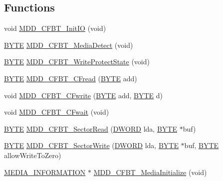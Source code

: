 \subsection*{Functions}
\begin{DoxyCompactItemize}
\item 
void \hyperlink{_c_f-_01_bit_01transaction_8h_ad8bb829eafee87e07a79cb75c3a40207}{M\+D\+D\+\_\+\+C\+F\+B\+T\+\_\+\+Init\+I\+O} (void)
\item 
\hyperlink{_generic_type_defs_8h_a4ae1dab0fb4b072a66584546209e7d58}{B\+Y\+T\+E} \hyperlink{_c_f-_01_bit_01transaction_8h_a3e3cb8714ab05c9eb06c1256cb66207e}{M\+D\+D\+\_\+\+C\+F\+B\+T\+\_\+\+Media\+Detect} (void)
\item 
\hyperlink{_generic_type_defs_8h_a4ae1dab0fb4b072a66584546209e7d58}{B\+Y\+T\+E} \hyperlink{_c_f-_01_bit_01transaction_8h_a5a37a6a14c1346909d87f15e269b95a7}{M\+D\+D\+\_\+\+C\+F\+B\+T\+\_\+\+Write\+Protect\+State} (void)
\item 
\hyperlink{_generic_type_defs_8h_a4ae1dab0fb4b072a66584546209e7d58}{B\+Y\+T\+E} \hyperlink{_c_f-_01_bit_01transaction_8h_aea3f7bb910466bb42e9fcf2aceda94f8}{M\+D\+D\+\_\+\+C\+F\+B\+T\+\_\+\+C\+Fread} (\hyperlink{_generic_type_defs_8h_a4ae1dab0fb4b072a66584546209e7d58}{B\+Y\+T\+E} add)
\item 
void \hyperlink{_c_f-_01_bit_01transaction_8h_afc2cd706413b4c18704118b998c8c6e8}{M\+D\+D\+\_\+\+C\+F\+B\+T\+\_\+\+C\+Fwrite} (\hyperlink{_generic_type_defs_8h_a4ae1dab0fb4b072a66584546209e7d58}{B\+Y\+T\+E} add, \hyperlink{_generic_type_defs_8h_a4ae1dab0fb4b072a66584546209e7d58}{B\+Y\+T\+E} d)
\item 
void \hyperlink{_c_f-_01_bit_01transaction_8h_a760749cb805dc17eef5fe99a0c9fb846}{M\+D\+D\+\_\+\+C\+F\+B\+T\+\_\+\+C\+Fwait} (void)
\item 
\hyperlink{_generic_type_defs_8h_a4ae1dab0fb4b072a66584546209e7d58}{B\+Y\+T\+E} \hyperlink{_c_f-_01_bit_01transaction_8h_a050ed287fab6e2993ad9145fb93e1533}{M\+D\+D\+\_\+\+C\+F\+B\+T\+\_\+\+Sector\+Read} (\hyperlink{_generic_type_defs_8h_ad342ac907eb044443153a22f964bf0af}{D\+W\+O\+R\+D} lda, \hyperlink{_generic_type_defs_8h_a4ae1dab0fb4b072a66584546209e7d58}{B\+Y\+T\+E} $\ast$buf)
\item 
\hyperlink{_generic_type_defs_8h_a4ae1dab0fb4b072a66584546209e7d58}{B\+Y\+T\+E} \hyperlink{_c_f-_01_bit_01transaction_8h_aa58a137b39f85971836d49568b43aeca}{M\+D\+D\+\_\+\+C\+F\+B\+T\+\_\+\+Sector\+Write} (\hyperlink{_generic_type_defs_8h_ad342ac907eb044443153a22f964bf0af}{D\+W\+O\+R\+D} lda, \hyperlink{_generic_type_defs_8h_a4ae1dab0fb4b072a66584546209e7d58}{B\+Y\+T\+E} $\ast$buf, \hyperlink{_generic_type_defs_8h_a4ae1dab0fb4b072a66584546209e7d58}{B\+Y\+T\+E} allow\+Write\+To\+Zero)
\item 
\hyperlink{struct_m_e_d_i_a___i_n_f_o_r_m_a_t_i_o_n}{M\+E\+D\+I\+A\+\_\+\+I\+N\+F\+O\+R\+M\+A\+T\+I\+O\+N} $\ast$ \hyperlink{_c_f-_01_bit_01transaction_8h_abd4c5a1d26d68946be679479a2a5eef0}{M\+D\+D\+\_\+\+C\+F\+B\+T\+\_\+\+Media\+Initialize} (void)
\end{DoxyCompactItemize}


